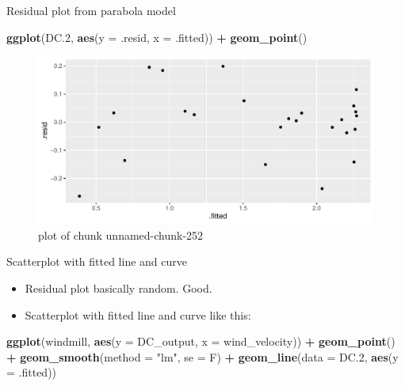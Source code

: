 \documentclass[ignorenonframetext,]{beamer}
\newenvironment{Shaded}{\begin{snugshade}}{\end{snugshade}}
\newcommand{\DataTypeTok}[1]{\textcolor[rgb]{0.13,0.29,0.53}{#1}}
\newcommand{\FloatTok}[1]{\textcolor[rgb]{0.00,0.00,0.81}{#1}}
\newcommand{\KeywordTok}[1]{\textcolor[rgb]{0.13,0.29,0.53}{\textbf{#1}}}
\newcommand{\NormalTok}[1]{#1}
\newcommand{\OperatorTok}[1]{\textcolor[rgb]{0.81,0.36,0.00}{\textbf{#1}}}
\newcommand{\StringTok}[1]{\textcolor[rgb]{0.31,0.60,0.02}{#1}}
\providecommand{\tightlist}{%
  \setlength{\itemsep}{0pt}\setlength{\parskip}{0pt}}
\begin{document}
\begin{frame}[fragile]{Residual plot from parabola model}
\protect\hypertarget{residual-plot-from-parabola-model}{}

\begin{Shaded}
\begin{Highlighting}[]
\KeywordTok{ggplot}\NormalTok{(DC}\FloatTok{.2}\NormalTok{, }\KeywordTok{aes}\NormalTok{(}\DataTypeTok{y =}\NormalTok{ .resid, }\DataTypeTok{x =}\NormalTok{ .fitted)) }\OperatorTok{+}
\StringTok{  }\KeywordTok{geom_point}\NormalTok{()}
\end{Highlighting}
\end{Shaded}

\begin{figure}
\centering
\includegraphics{figure/unnamed-chunk-252-1.pdf}
\caption{plot of chunk unnamed-chunk-252}
\end{figure}

\end{frame}

\begin{frame}[fragile]{Scatterplot with fitted line and curve}
\protect\hypertarget{scatterplot-with-fitted-line-and-curve}{}

\begin{itemize}
\tightlist
\item
  Residual plot basically random. Good.
\item
  Scatterplot with fitted line and curve like this:
\end{itemize}

\begin{Shaded}
\begin{Highlighting}[]
\KeywordTok{ggplot}\NormalTok{(windmill, }\KeywordTok{aes}\NormalTok{(}\DataTypeTok{y =}\NormalTok{ DC_output, }\DataTypeTok{x =}\NormalTok{ wind_velocity)) }\OperatorTok{+}
\StringTok{  }\KeywordTok{geom_point}\NormalTok{() }\OperatorTok{+}\StringTok{ }\KeywordTok{geom_smooth}\NormalTok{(}\DataTypeTok{method =} \StringTok{"lm"}\NormalTok{, }\DataTypeTok{se =}\NormalTok{ F) }\OperatorTok{+}
\StringTok{  }\KeywordTok{geom_line}\NormalTok{(}\DataTypeTok{data =}\NormalTok{ DC}\FloatTok{.2}\NormalTok{, }\KeywordTok{aes}\NormalTok{(}\DataTypeTok{y =}\NormalTok{ .fitted))}
\end{Highlighting}
\end{Shaded}

\end{frame}
\end{document}
